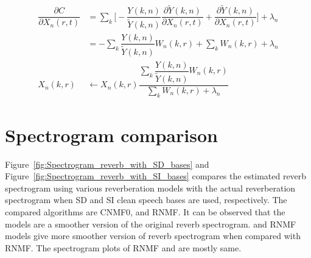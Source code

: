 \begin{align}
\dfrac{\partial C}{\partial X_n(r,t)} &= \sum_k \Bigg[-\dfrac{Y(k,n)}{\tilde{Y}(k,n)} \dfrac{\partial \tilde{Y}(k,n)}{\partial X_n(r,t)} + \dfrac{\partial \tilde{Y}(k,n)}{\partial X_n(r,t)} \Bigg] + \lambda_n \nonumber \\
&= -\sum_k \dfrac{Y(k,n)}{\tilde{Y}(k,n)} W_n(k,r) + \sum_k W_n(k,r) + \lambda_n \nonumber \\ 
X_n(k,r) &\leftarrow X_n(k,r) \dfrac{\sum_k \dfrac{Y(k,n)}{\tilde{Y}(k,n)} W_n(k,r)}{\sum_k W_n(k,r) + \lambda_n}
\label{eq:updateXn}
\end{align}

\iffalse
\section{Spectrogram comparison}
Figure~\ref{fig:Spectrogram_reverb_with_SD_bases} and Figure~\ref{fig:Spectrogram_reverb_with_SI_bases} compares the estimated reverb spectrogram using various reverberation models with the actual reverberation spectrogram when SD and SI clean speech bases are used, respectively. The compared algorithms are CNMF0,  and RNMF. It can be observed that the models are a smoother version of the original reverb spectrogram.  and RNMF models give more smoother version of reverb spectrogram when compared with RNMF. The spectrogram plots of RNMF and  are mostly same.
